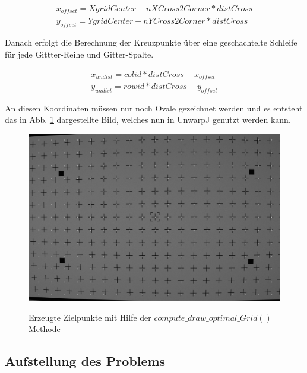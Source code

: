 \begin{equation}
\label{equ:gitter_offset}
\begin{split}
x_{offset} = XgridCenter - nXCross2Corner * distCross\\		 y_{offset} = YgridCenter - nYCross2Corner * distCross
\end{split}
\end{equation}

Danach erfolgt die Berechnung der Kreuzpunkte über eine geschachtelte Schleife für jede Gittter-Reihe und Gitter-Spalte. 

\begin{equation}
\label{equ:gitter_kreuzpunkte}
\begin{split}
x_{undist} = colid * distCross+ x_{offset}\\
y_{undist} = rowid * distCross + y_{offset}
\end{split}
\end{equation}

An diesen Koordinaten müssen nur noch Ovale gezeichnet werden und es entsteht das in Abb. \ref{fig:gitter-optimal} dargestellte Bild, welches nun in UnwarpJ genutzt werden kann.

\begin{figure}[H]
\includegraphics[width=\textwidth]{Images/optimales-gitter.png}
\label{fig:gitter-optimal}
\caption{Erzeugte Zielpunkte mit Hilfe der $compute\_draw\_optimal\_Grid()$ Methode}
\end{figure}

\subsection{Aufstellung des Problems}

